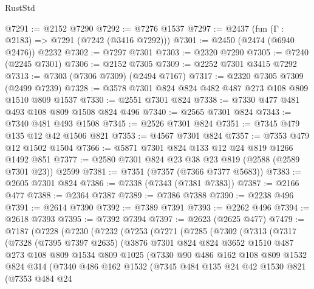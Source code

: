 \begin{lexlean}{RustStd}
\begin{coremodule}
@7291 := @2152 @7290
@7292 := @7276 @1537
@7297 := @2437 (fun (Γ : @2183) => @7291 (@7242 (@3416 @7292)))
@7301 := @2450 (@2474 (@6940 @2476)) @2232
@7302 := @7297 @7301
@7303 := @2320 @7290
@7305 := @7240 (@2245 @7301)
@7306 := @2152 @7305
@7309 := @2252 @7301 @3415 @7292
@7313 := @7303 (@7306 @7309) (@2494 @7167)
@7317 := @2320 @7305 @7309 (@2499 @7239)
@7328 := @3578 @7301 @824 @824 @482 @487 @273 @108 @809 @1510 @809 @1537
@7330 := @2551 @7301 @824
@7338 := @7330 @477 @481 @493 @108 @809 @1508 @824 @496
@7340 := @2565 @7301 @824
@7343 := @7340 @481 @493 @1508
@7345 := @2526 @7301 @824
@7351 := @7345 @479 @135 @12 @42 @1506 @821
@7353 := @4567 @7301 @824
@7357 := @7353 @479 @12 @1502 @1504
@7366 := @5871 @7301 @824 @133 @12 @24 @819 @1266 @1492 @851
@7377 := @2580 @7301 @824 @23 @38 @23 @819 (@2588 (@2589 @7301 @23)) @2599
@7381 := @7351 (@7357 (@7366 @7377 @5683))
@7383 := @2605 @7301 @824
@7386 := @7338 (@7343 (@7381 @7383))
@7387 := @2166 @477
@7388 := @2364 @7387
@7389 := @7386 @7388
@7390 := @2238 @496
@7391 := @2614 @7390
@7392 := @7389 @7391
@7393 := @2262 @496
@7394 := @2618 @7393
@7395 := @7392 @7394
@7397 := @2623 (@2625 @477)
@7479 := @7187
    (@7228
      (@7230
        (@7232
          (@7253
            (@7271
              (@7285
                (@7302
                  (@7313
                    (@7317
                      (@7328
                        (@7395 @7397 @2635)
                        (@3876
                          @7301
                          @824
                          @824
                          @3652
                          @1510
                          @487
                          @273
                          @108
                          @809
                          @1534
                          @809
                          @1025
                          (@7330
                            @90
                            @486
                            @162
                            @108
                            @809
                            @1532
                            @824
                            @314
                            (@7340
                              @486
                              @162
                              @1532
                              (@7345
                                @484
                                @135
                                @24
                                @42
                                @1530
                                @821
                                (@7353
                                  @484
                                  @24

\end{coremodule}
\end{lexlean}
